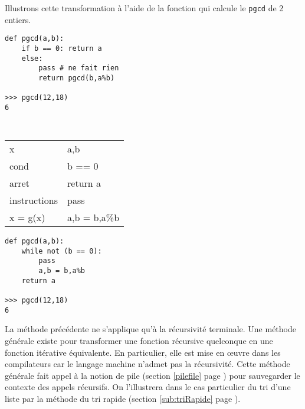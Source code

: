 \vspace*{2mm}

\noindent Illustrons cette transformation à l'aide de la fonction qui calcule le {\tt pgcd} de 2 entiers.

\noindent\mbox{}\hspace*{1cm}\begin{py}{4cm}
\begin{verbatim}
def pgcd(a,b):
    if b == 0: return a
    else: 
        pass # ne fait rien
        return pgcd(b,a%b)

>>> pgcd(12,18)
6
\end{verbatim}
\end{py}
\hfill
\begin{py}{4cm}\tt
\begin{tabular}[t]{|l@{ $\rightarrow$ }l|}
\hline
x & a,b\\
cond & b == 0\\
arret & return a\\
instructions & {\rm pass}\\
x = g(x) & a,b = b,a\%b\\
\hline
\end{tabular}
\end{py}
\hfill
\begin{py}{4cm}
\begin{verbatim}
def pgcd(a,b):
    while not (b == 0):
        pass
        a,b = b,a%b
    return a

>>> pgcd(12,18)
6
\end{verbatim}
\end{py}

\vspace*{2mm}

La méthode précédente ne s'applique qu'à la récursivité terminale.
Une méthode générale existe pour transformer une fonction récursive
quelconque en une fonction itérative équivalente. En particulier,
elle est mise en \oe uvre dans les compilateurs car le langage machine 
n'admet pas la récursivité. Cette méthode générale fait appel à la notion 
de pile (section \ref{pilefile} page \pageref{pilefile}) pour sauvegarder
le contexte des appels récursifs. On l'illustrera dans le cas particulier 
du tri d'une liste par la méthode
du tri rapide (section \ref{sub:triRapide} page \pageref{sub:triRapide}).

\newpage
\setlength{\textwidth}{25cm}
\setlength{\textheight}{16cm}
\setlength{\marginparwidth}{0cm}
\setlength{\marginparsep}{0cm}
\setlength{\linewidth}{25cm}
\setlength{\oddsidemargin}{0cm}
\setlength{\evensidemargin}{0cm}
\setlength{\topmargin}{-0.75cm}

